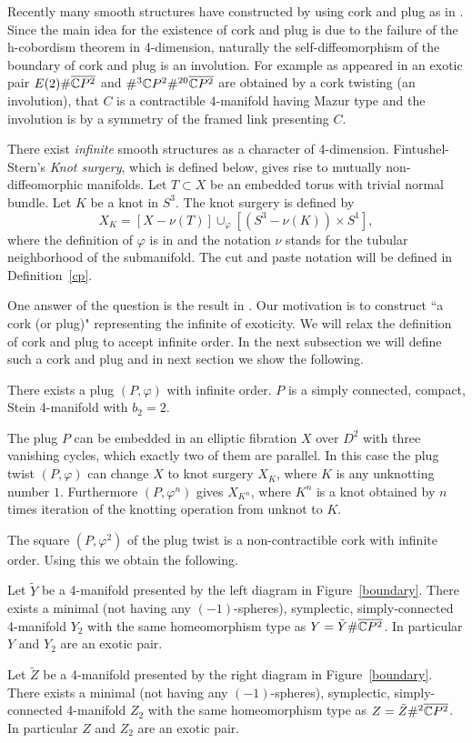 \documentclass[11pt]{amsart}
\begin{document}
Recently many smooth structures have constructed by using cork and plug as in
\cite{[A2],[AY1],[AY2],[AY3],[AY4],[GS]}.
Since the main idea for the existence of cork and plug is due to the failure of the h-cobordism theorem in 4-dimension,
naturally the self-diffeomorphism of the boundary of cork and plug is an involution.
For example as appeared in \cite{[GS]} an exotic pair 
$E(2)\#\overline{{\Bbb C}P^2}$ and $\#^3{\Bbb C}P^2\#^{20}\overline{{\Bbb C}P^2}$ are
obtained by a cork twisting (an involution), that $C$ is a contractible 4-manifold having Mazur type and the involution is
by a symmetry of the framed link presenting $C$.

There exist {\it infinite} smooth structures as a character of 4-dimension.
Fintushel-Stern's {\it Knot surgery}, which is defined below, gives rise to mutually non-diffeomorphic manifolds.
Let $T\subset X$ be an embedded torus with trivial normal bundle.
Let $K$ be a knot in $S^3$.
The knot surgery is defined by
$$X_K=[X-\nu(T)]\cup_{\varphi}[(S^3-\nu(K))\times S^1],$$
where the definition of $\varphi$ is in \cite{[FS]}
and the notation $\nu$ stands for the tubular neighborhood of the submanifold.
The cut and paste notation will be defined in Definition~\ref{cp}.

One answer of the question is the result in \cite{[A2]}.
Our motivation is to construct ``a cork (or plug)" representing the infinite of exoticity.
We will relax the definition of cork and plug to accept infinite order.
In the next subsection we will define such a cork and plug and 
in next section we show the following.
\begin{thm}
\label{main}
There exists a plug $(P,\varphi)$ with infinite order.
$P$ is a simply connected, compact, Stein 4-manifold with $b_2=2$.
\end{thm}

The plug $P$ can be embedded in an elliptic fibration $X$ over $D^2$ with three vanishing cycles, which exactly two of them
are parallel.
In this case the plug twist $(P,\varphi)$ can change $X$ to knot surgery $X_K$,
where $K$ is any unknotting number $1$.
Furthermore $(P,\varphi^n)$ gives $X_{K^n}$, where $K^n$ is a knot obtained by $n$ times iteration
of the knotting operation from unknot to $K$.

The square $(P,\varphi^2)$ of the plug twist is a non-contractible cork with infinite order.
Using this we obtain the following.
\begin{thm}
\label{exoticex}
Let $\tilde{Y}$ be a 4-manifold presented by the left diagram in Figure~\ref{boundary}.
There exists a minimal (not having any $(-1)$-spheres), symplectic, simply-connected 4-manifold $Y_2$ with 
the same homeomorphism type as $Y=\tilde{Y}\#\overline{{\Bbb C}P^2}$.
In particular $Y$ and $Y_2$ are an exotic pair.

Let $\tilde{Z}$ be a 4-manifold presented by the right diagram in Figure~\ref{boundary}.
There exists a minimal (not having any $(-1)$-spheres), symplectic, simply-connected 4-manifold $Z_2$ with 
the same homeomorphism type as $Z=\tilde{Z}\#^2\overline{{\Bbb C}P^2}$.
In particular $Z$ and $Z_2$ are an exotic pair.

\end{thm}
\end{document}
